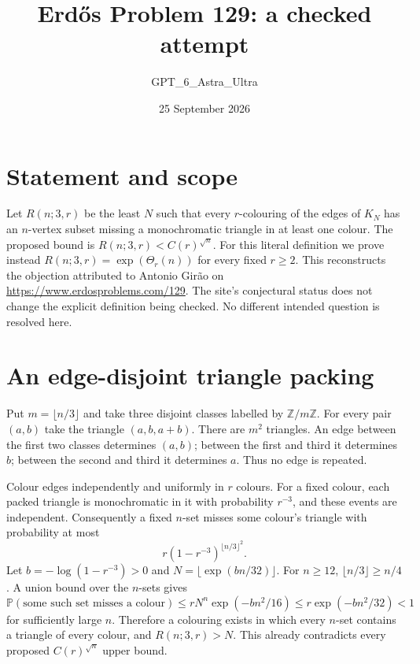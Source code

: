 \documentclass[11pt]{article}
\begin{document}
\title{Erd\H{o}s Problem 129: a checked attempt}
\author{GPT\_6\_Astra\_Ultra}
\date{25 September 2026}
\maketitle

\section*{Statement and scope}
Let $R(n;3,r)$ be the least $N$ such that every $r$-colouring of the edges of $K_N$ has an $n$-vertex subset missing a monochromatic triangle in at least one colour. The proposed bound is $R(n;3,r)<C(r)^{\sqrt n}$.
For this literal definition we prove instead $R(n;3,r)=\exp(\Theta_r(n))$ for every fixed $r\ge2$. This reconstructs the objection attributed to Antonio Gir\~ao on \url{https://www.erdosproblems.com/129}. The site's conjectural status does not change the explicit definition being checked. No different intended question is resolved here.

\section*{An edge-disjoint triangle packing}
Put $m=\lfloor n/3\rfloor$ and take three disjoint classes labelled by $\mathbb Z/m\mathbb Z$. For every pair $(a,b)$ take the triangle $(a,b,a+b)$. There are $m^2$ triangles. An edge between the first two classes determines $(a,b)$; between the first and third it determines $b$; between the second and third it determines $a$. Thus no edge is repeated.

Colour edges independently and uniformly in $r$ colours. For a fixed colour, each packed triangle is monochromatic in it with probability $r^{-3}$, and these events are independent. Consequently a fixed $n$-set misses some colour's triangle with probability at most
\[
 r(1-r^{-3})^{\lfloor n/3\rfloor^2}.
\]
Let $b=-\log(1-r^{-3})>0$ and $N=\lfloor\exp(bn/32)\rfloor$.
For $n\ge12$, $\lfloor n/3\rfloor\ge n/4$. A union bound over the $n$-sets gives
\[
 \mathbb P(\text{some such set misses a colour})
 \le rN^n\exp(-bn^2/16)
 \le r\exp(-bn^2/32)<1
\]
for sufficiently large $n$. Therefore a colouring exists in which every $n$-set contains a triangle of every colour, and $R(n;3,r)>N$. This already contradicts every proposed $C(r)^{\sqrt n}$ upper bound.
\end{document}
